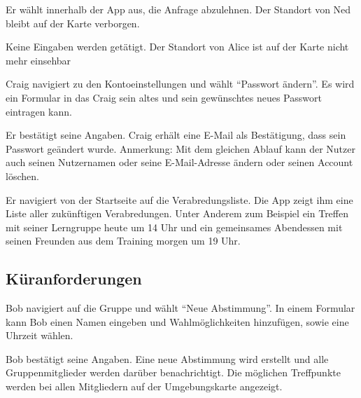 \documentclass[parskip=full,11pt]{scrartcl}
\begin{document}
{Er wählt innerhalb der App aus, die Anfrage abzulehnen.}
{Der Standort von Ned bleibt auf der Karte verborgen.}

{Keine Eingaben werden getätigt.}
{Der Standort von Alice ist auf der Karte nicht mehr einsehbar}


{Craig navigiert zu den Kontoeinstellungen und wählt \enquote{Passwort ändern}.}
{Es wird ein Formular in das Craig sein altes und sein gewünschtes neues Passwort eintragen kann.}

{Er bestätigt seine Angaben.}
{Craig erhält eine E-Mail als Bestätigung, dass sein Passwort geändert wurde.}
Anmerkung: Mit dem gleichen Ablauf kann der Nutzer auch seinen Nutzernamen oder seine
E-Mail-Adresse ändern oder seinen Account löschen.



{Er navigiert von der Startseite auf die Verabredungsliste.}
{Die App zeigt ihm eine Liste aller zukünftigen Verabredungen.
Unter Anderem zum Beispiel ein Treffen mit seiner Lerngruppe heute um 14 Uhr
und ein gemeinsames Abendessen mit seinen Freunden aus dem Training morgen um 19 Uhr.}


\subsection{Küranforderungen}
{Bob navigiert auf die Gruppe und wählt \enquote{Neue Abstimmung}.}
{In einem Formular kann Bob einen Namen eingeben und Wahlmöglichkeiten hinzufügen,
	sowie eine Uhrzeit wählen.}

{Bob bestätigt seine Angaben.}
{Eine neue Abstimmung wird erstellt und alle Gruppenmitglieder werden darüber benachrichtigt.
Die möglichen Treffpunkte werden bei allen Mitgliedern auf der Umgebungskarte angezeigt.}
\end{document}
